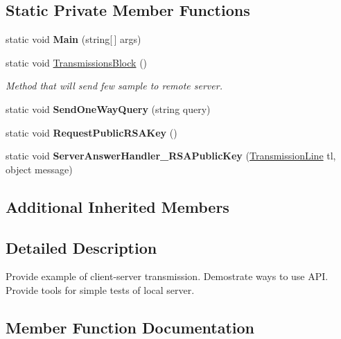 \subsection*{Static Private Member Functions}
\begin{DoxyCompactItemize}
\item 
\mbox{\label{class_test_client_1_1_client_a236c6c2776f2ec6851c36a8714ef6e03}} 
static void {\bfseries Main} (string\mbox{[}$\,$\mbox{]} args)
\item 
static void \mbox{\hyperlink{class_test_client_1_1_client_a7096d201835f0f2c3049fef72e89637c}{Transmissions\+Block}} ()
\begin{DoxyCompactList}\small\item\em Method that will send few sample to remote server. \end{DoxyCompactList}\item 
\mbox{\label{class_test_client_1_1_client_af74ca9833b73440828e078c9c25a8026}} 
static void {\bfseries Send\+One\+Way\+Query} (string query)
\item 
\mbox{\label{class_test_client_1_1_client_a0d6d95892249c5febdb5708995b7a987}} 
static void {\bfseries Request\+Public\+R\+S\+A\+Key} ()
\item 
\mbox{\label{class_test_client_1_1_client_a727dec85daa92923e35fc5ae6fcb70ed}} 
static void {\bfseries Server\+Answer\+Handler\+\_\+\+R\+S\+A\+Public\+Key} (\mbox{\hyperlink{class_pipes_provider_1_1_client_1_1_transmission_line}{Transmission\+Line}} tl, object message)
\end{DoxyCompactItemize}
\subsection*{Additional Inherited Members}


\subsection{Detailed Description}
Provide example of client-\/server transmission. Demostrate ways to use A\+PI. Provide tools for simple tests of local server. 



\subsection{Member Function Documentation}
\mbox{\label{class_test_client_1_1_client_a7096d201835f0f2c3049fef72e89637c}} 
